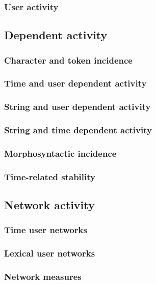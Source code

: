 \documentclass[a4paper, 11pt]{article} %
\begin{document}
\subsubsection{User activity}
\subsection{Dependent activity}
\subsubsection{Character and token incidence}
\subsubsection{Time and user dependent activity}
\subsubsection{String and user dependent activity}
\subsubsection{String and time dependent activity}
\subsubsection{Morphosyntactic incidence}
\subsubsection{Time-related stability}
\subsection{Network activity}
\subsubsection{Time user networks}

\subsubsection{Lexical user networks}

\subsubsection{Network measures}
\end{document}
